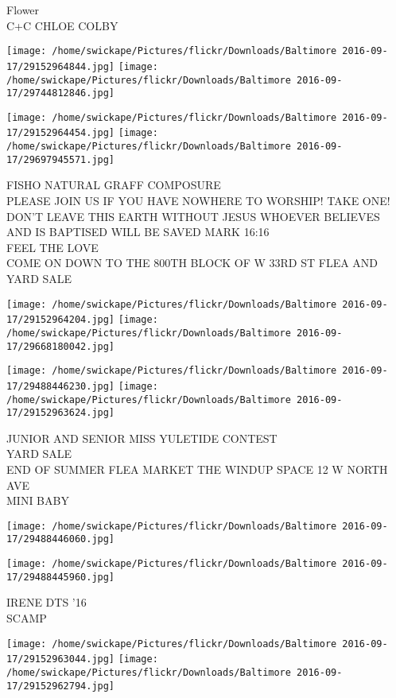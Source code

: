 \documentclass[10pt,letterpaper]{article}
\begin{document}
Flower\\
C+C CHLOE COLBY
\pagebreak

\texttt{[image: /home/swickape/Pictures/flickr/Downloads/Baltimore 2016-09-17/29152964844.jpg]}
\texttt{[image: /home/swickape/Pictures/flickr/Downloads/Baltimore 2016-09-17/29744812846.jpg]}

\texttt{[image: /home/swickape/Pictures/flickr/Downloads/Baltimore 2016-09-17/29152964454.jpg]}
\texttt{[image: /home/swickape/Pictures/flickr/Downloads/Baltimore 2016-09-17/29697945571.jpg]}

FISHO NATURAL GRAFF COMPOSURE\\
PLEASE JOIN US IF YOU HAVE NOWHERE TO WORSHIP!  TAKE ONE!  DON'T LEAVE THIS EARTH WITHOUT JESUS WHOEVER BELIEVES AND IS BAPTISED WILL BE SAVED MARK 16:16\\
FEEL THE LOVE\\
COME ON DOWN TO THE 800TH BLOCK OF W 33RD ST FLEA AND YARD SALE
\pagebreak

\texttt{[image: /home/swickape/Pictures/flickr/Downloads/Baltimore 2016-09-17/29152964204.jpg]}
\texttt{[image: /home/swickape/Pictures/flickr/Downloads/Baltimore 2016-09-17/29668180042.jpg]}

\texttt{[image: /home/swickape/Pictures/flickr/Downloads/Baltimore 2016-09-17/29488446230.jpg]}
\texttt{[image: /home/swickape/Pictures/flickr/Downloads/Baltimore 2016-09-17/29152963624.jpg]}

JUNIOR AND SENIOR MISS YULETIDE CONTEST\\
YARD SALE\\
END OF SUMMER FLEA MARKET THE WINDUP SPACE 12 W NORTH AVE\\
MINI BABY
\pagebreak

\texttt{[image: /home/swickape/Pictures/flickr/Downloads/Baltimore 2016-09-17/29488446060.jpg]}

\vspace{0.25in}
\texttt{[image: /home/swickape/Pictures/flickr/Downloads/Baltimore 2016-09-17/29488445960.jpg]}

IRENE DTS '16\\
SCAMP
\pagebreak

\texttt{[image: /home/swickape/Pictures/flickr/Downloads/Baltimore 2016-09-17/29152963044.jpg]}
\texttt{[image: /home/swickape/Pictures/flickr/Downloads/Baltimore 2016-09-17/29152962794.jpg]}
\end{document}
